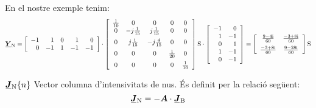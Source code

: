 \begin{list}{}
   En el nostre exemple tenim:
   {\fontsize{10pt}{10pt}\selectfont
   \[
      \mcmplx{Y}\ped{N} =
      \begin{bmatrix}\begin{array}{rrrrr}
      	 -1 & 1  & 0 &  1 & 0 \\  0 & -1 & 1 & -1 & -1
      \end{array}\end{bmatrix} \cdot
      \begin{bmatrix}\begin{array}{ccccc}
            \frac{1}{10} & 0 & 0 & 0 & 0 \\
            0 & -j\frac{1}{15} & j\frac{1}{15} & 0 & 0 \\[2mm]
            0 & j\frac{1}{15} & -j\frac{4}{15} & 0 & 0 \\[2mm]
            0 & 0 & 0 & \frac{1}{20} & 0 \\[2mm]
            0 & 0 & 0 & 0 & \frac{1}{10}
      \end{array}\end{bmatrix}\unit{S} \cdot
      \begin{bmatrix}\begin{array}{rr} 
      	-1 & 0 \\ 1  & -1 \\  0 & 1 \\ 1 & -1 \\ 0 & -1
      \end{array}\end{bmatrix}
       =
      \begin{bmatrix}\begin{array}{cc}
            \frac{\complexnum{9 - j 4}}{60} & \frac{\complexnum{-3 + j 8}}{60} \\[2mm]
            \frac{\complexnum{-3 + j 8}}{60} & \frac{\complexnum{9 - j 28}}{60}
      \end{array}\end{bmatrix}\unit{S}
      \label{eq:yn}
   \]}

   \item[$\mcmplx{J}\ped{N}\{n\}$] Vector columna d'intensivitats de nus. És definit per la relació següent:
   \begin{equation}
      \mcmplx{J}\ped{N} = - \boldsymbol{A} \cdot\mcmplx{J}\ped{B}
   \end{equation}


\end{list}
